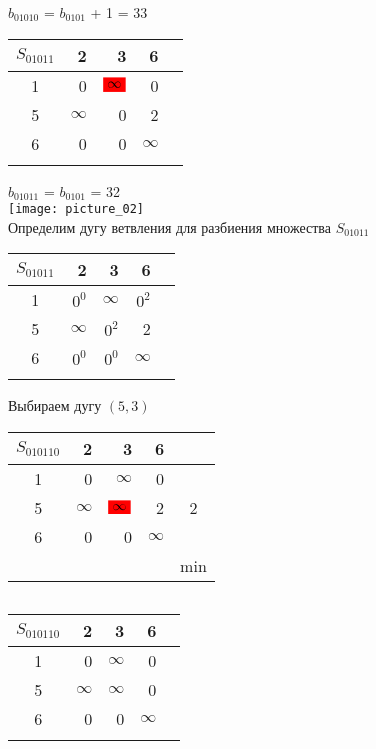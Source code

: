 \documentclass[12pt]{article}
\begin{document}
$b_{01010}$ = $b_{0101}$ + 1 = 33\\

\begin{flushleft}
 \begin{tabular}{c||rrr||c}
$S_{01011}$  &2 & 3  & 6 & \\
\hline
\hline
1 & 0 & $\colorbox{red}{$\infty$}$ & 0 & \\
5 & $\infty$ &  0 & 2 &\\
6 & 0 & 0  & $\infty$ & \\
\hline
\hline
 & &  &   & \\
\end{tabular}
\end{flushleft}

$b_{01011}$ = $b_{0101}$ = 32\\

\texttt{[image: picture\_02]}\\ 



Определим дугу ветвления для разбиения множества $S_{01011}$\\

\begin{flushleft}
 \begin{tabular}{c||rrr||c}
$S_{01011}$  &2 & 3  & 6 & \\
\hline
\hline
1 & $0^0$ & $\infty$ & $0^2$ & \\
5 & $\infty$ &  $0^2$ & 2 &\\
6 & $0^0$ & $0^0$  & $\infty$ & \\
\hline
\hline
 & &  &   & \\
\end{tabular}
\end{flushleft}

Выбираем дугу $(5,3)$

\begin{flushleft}
 \begin{tabular}{c||rrr||c}
$S_{010110}$  &2 & 3  & 6 & \\
\hline
\hline
1 & 0 & $\infty$ & 0 & \\
5 & $\infty$ & $\colorbox{red}{$\infty$}$ & 2 &2\\
6 & 0 & 0  & $\infty$ & \\
\hline
\hline
 & &  &   &min \\
\end{tabular}
$\qquad $ 
 \begin{tabular}{c||rrr||c}
$S_{010110}$  &2 & 3  & 6 & \\
\hline
\hline
1 & 0 & $\infty$ & 0 & \\
5 & $\infty$ & $\infty$ & 0 &\\
6 & 0 & 0  & $\infty$ & \\
\hline
\hline
 & &  &   & \\
\end{tabular}
\end{flushleft}
\end{document}
